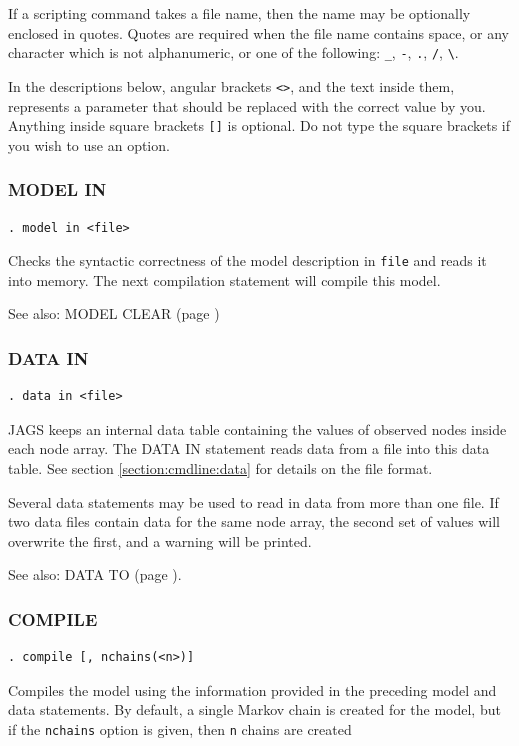 \documentclass[11pt, a4paper, titlepage]{report}
\begin{document}
If a scripting command takes a file name, then the name may be
optionally enclosed in quotes. Quotes are required when the file name
contains space, or any character which is not alphanumeric, or one of
the following: \verb+_+, \verb+-+, \verb+.+, \verb+/+, \verb+\+.

In the descriptions below, angular brackets \verb+<>+, and the text
inside them, represents a parameter that should be replaced with the
correct value by you.  Anything inside square brackets \verb+[]+ is
optional. Do not type the square brackets if you wish to use an
option.

\subsubsection{MODEL IN}

\begin{verbatim}
. model in <file>
\end{verbatim}
Checks the syntactic correctness of the model description in
\texttt{file} and reads it into memory. The next compilation
statement will compile this model. 

See also: MODEL CLEAR (page \pageref{model:clear})

\subsubsection{DATA IN}
\label{data:in}

\begin{verbatim}
. data in <file>
\end{verbatim}
JAGS keeps an internal data table containing the values of observed
nodes inside each node array.  The DATA IN statement reads data from a
file into this data table. See section \ref{section:cmdline:data} for
details on the file format.

Several data statements may be used to read in data from more than one
file. If two data files contain data for the same node array, the second
set of values will overwrite the first, and a warning will be printed.

See also: DATA TO (page \pageref{data:to}).

\subsubsection{COMPILE}

\begin{verbatim}
. compile [, nchains(<n>)]
\end{verbatim}
Compiles the model using the information provided in the preceding
model and data statements. By default, a single Markov chain is
created for the model, but if the \texttt{nchains} option is given,
then \texttt{n} chains are created 
\end{document}

